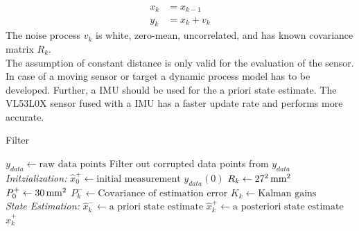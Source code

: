 \begin{equation}
\label{eq:filter}
\begin{split} 
x_k & = x_{k-1} \\
y_k & = x_k + v_k
\end{split}
\end{equation}
The noise process $v_k$ is white, zero-mean, uncorrelated, and has known covariance matrix  $R_k$.\\
The assumption of constant distance is only valid for the evaluation of the sensor. In case of a moving sensor or target a dynamic process model has to be developed. Further, a IMU should be used for the a priori state estimate. The VL53L0X sensor fused with a IMU has a faster update rate and performs more accurate. \\

\begin{algorithm}
	\caption{Filter}\label{alg:filter}
	\begin{algorithmic}[1]
		\State $y_{data}\gets \text{raw data points}$ 
		\State Filter out corrupted data points from $y_{data}$ \\
		\textit{Initzialization:}
		\State $\hat{x}^+_0\gets\text{initial measurement }y_{data}(0)$
		\State $R_k\gets\unit[27^2]{mm^2}$ 
		\State $P^+_0\gets \unit[30]{mm^2}$ 
		\For{ each $k = (0, \text{ number of data point]}$}	
		\State  $P^-_k \gets \text{Covariance of estimation error}$
		\State	$K_k \gets \text{Kalman gains}$
		\EndFor \\
		\textit{State Estimation:}	 
		\For{ each $k = (0, \text{ number of data point]}$}
		\State {} 
		\State $\hat{x}^-_k \gets \text{a priori state estimate}$
		\State $\hat{x}^+_k \gets \text{a posteriori state estimate}$
		\EndFor
		\State \Return $\hat{x}^+_k$
		\EndProcedure
		
	\end{algorithmic}
\end{algorithm}


